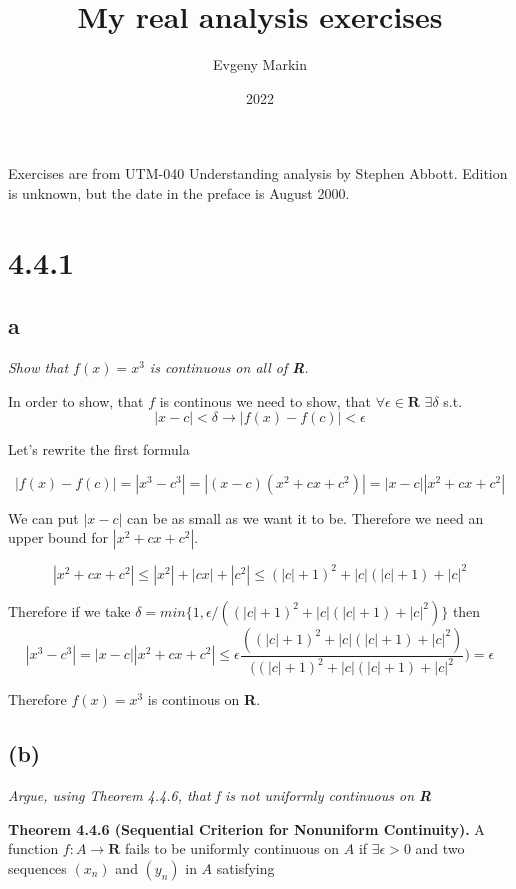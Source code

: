 \documentclass[11pt,oneside,titlepage]{article}
\title{My real analysis exercises}
\author{Evgeny Markin}
\date{2022}
\begin{document}
\maketitle

Exercises are from UTM-040 Understanding analysis by Stephen Abbott. Edition is
unknown, but the date in the preface is August 2000.

\section*{4.4.1}

\subsection*{{a}}
\textit{Show that $f(x) = x^{3}$ is continuous on all of \textbf{R}.}

In order to show, that $f$ is continous we need to show, that $\forall
\epsilon \in \textbf{R}$ $\exists \delta$ s.t.
$$|x - c| < \delta \to |f(x) - f(c)| < \epsilon$$

Let's rewrite the first formula

$$ |f(x) - f(c)| = |x^{3} - c^{3}| = |(x - c)(x^{2} + cx + c^{2})| =
|x - c||x^{2} + cx + c^{2}|$$

We can put $|x - c|$ can be as small as we want it to be. Therefore we need
an upper bound for $|x^{2} + cx + c^{2}|$.

$$|x^{2} + cx + c^{2}| \leq |x^{2}| + |cx| + |c^{2}| \leq (|c| + 1)^{2} +
|c|(|c| + 1) + |c|^{2}$$



Therefore if we take
$\delta = min\{1, \epsilon/((|c| + 1)^{2} + |c|(|c| + 1) + |c|^{2})\}$
then
$$|x^3 - c^3| = |x-c||x^2 + cx + c^2| \leq \epsilon \frac{((|c| + 1)^{2} +
  |c|(|c| + 1) + |c|^{2}) }{ ((|c| + 1)^{2} + |c|(|c| + 1) + |c|^{2}})
= \epsilon$$

Therefore $f(x) = x ^3$ is continous on \textbf{R}.

\subsection*{(b)}
\textit{Argue, using Theorem 4.4.6, that f is not uniformly continuous
  on \textbf{R}}


\textbf{Theorem 4.4.6 (Sequential Criterion for Nonuniform Continuity).} A
function $f:A \to \textbf{R}$ fails to be uniformly continuous on $A$ if
$\exists \epsilon > 0 $ and  two sequences $(x_n)$ and $(y_n)$ in $A$
satisfying
\end{document}
